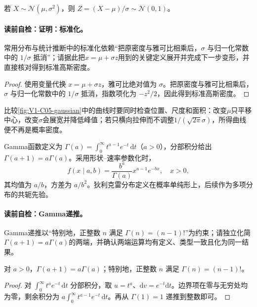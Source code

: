 \begin{lemma}[标准化]
若 $X\sim\mathcal N(\mu,\sigma^2)$，则 $Z=(X-\mu)/\sigma\sim\mathcal N(0,1)$。
\end{lemma}
\paragraph{读前自检：证明：标准化。}常用分布与统计推断中的标准化依赖“把原密度与雅可比相乘后，$\sigma$ 与归一化常数中的 $1/\sigma$ 抵消”；请据此把$x=\mu+\sigma z$用到的关键定义展开并完成下一步变形，并直接核对得到标准高斯密度。\par

\begin{proof}
使用变量代换 $x=\mu+\sigma z$，雅可比绝对值为 $\sigma$。把原密度与雅可比相乘后，$\sigma$ 与归一化常数中的 $1/\sigma$ 抵消，指数项化为 $-z^2/2$，因此得到标准高斯密度。
\end{proof}

\label{struct:V1-C05-CH19}

比较\cref{fig:V1-C05-gaussian}中的曲线时要同时检查位置、尺度和面积：改变$\mu$只平移中心，改变$\sigma$会展宽并降低峰值；若只横向拉伸而不调整$1/(\sqrt{2\pi}\sigma)$，所得曲线便不再是概率密度。


Gamma函数定义为 $\Gamma(a)=\int_0^\infty t^{a-1}e^{-t}\,\mathrm dt$（$a>0$），分部积分给出 $\Gamma(a+1)=a\Gamma(a)$。采用形状--速率参数化时，
\[
f(x\mid a,b)=\frac{b^a}{\Gamma(a)}x^{a-1}e^{-bx},\quad x>0,
\]
其均值为 $a/b$，方差为 $a/b^2$。狄利克雷分布定义在概率单纯形上，后续作为多项分布的共轭先验。

\label{struct:V1-C05-CH13}
\paragraph{读前自检：Gamma递推。}Gamma递推以“特别地，正整数 $n$ 满足 $\Gamma(n)=(n-1)!$”为约束；请独立化简$\Gamma(a+1)=a\Gamma(a)$的两端，并确认两端运算均有定义、类型一致且化为同一结果。\par

\begin{lemma}[Gamma递推]
对 $a>0$，$\Gamma(a+1)=a\Gamma(a)$；特别地，正整数 $n$ 满足 $\Gamma(n)=(n-1)!$。
\end{lemma}
\begin{proof}
对 $\int_0^\infty t^ae^{-t}\,\mathrm dt$ 分部积分，取 $u=t^a$、$\mathrm dv=e^{-t}\mathrm dt$。边界项在零与无穷处均为零，剩余积分为 $a\int_0^\infty t^{a-1}e^{-t}\,\mathrm dt$。再从 $\Gamma(1)=1$ 递推到整数即可。
\end{proof}


